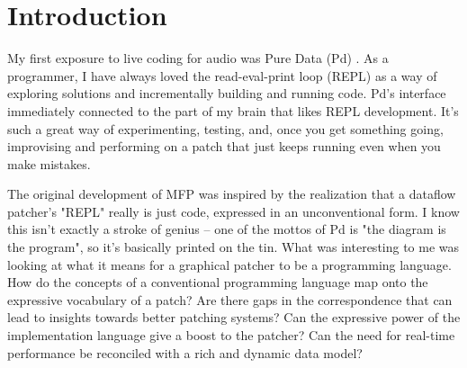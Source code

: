\documentclass[a4paper]{article}
\title{\papertitle}
\affiliation{ \paperauthorA}
{{\tt \href{mailto:grib@billgribble.com}{grib@billgribble.com}}}
\def\:{\hskip0pt}
\newif\ifpdf
\begin{document}
\ifpdf %
  \DeclareGraphicsExtensions{.png,.jpg,.pdf}
\else  %
\fi

\maketitle

\begin{abstract}
MFP is a graphical patching system distinguished by the ready
availability of Python data types and operations in patches.
Recent work has added support for live coding of
message\:-\:processing patch elements in Python, and of
signal\:-\:processing patch elements in Faust.  Its extensibility
and rich set of message data types give MFP some nice
capabilities for interactive patching.
\end{abstract}

\section{Introduction}
\label{sec:intro}

My first exposure to live coding for audio was Pure Data (Pd)
\cite{Puck:PureData}. As a programmer, I have always loved the
read-eval-print loop (REPL) as a way of exploring solutions and
incrementally building and running code. Pd's interface
immediately connected to the part of my brain that likes REPL
development. It's such a great way of experimenting, testing,
and, once you get something going, improvising and performing on
a patch that just keeps running even when you make mistakes.

The original development of MFP was inspired by the realization
that a dataflow patcher's "REPL" really is just code, expressed
in an unconventional form. I know this isn't exactly a stroke of
genius -- one of the mottos of Pd is "the diagram is the
program", so it's basically printed on the tin. What was
interesting to me was looking at what it means for a graphical
patcher to be a programming language. How do the concepts of a
conventional programming language map onto the expressive
vocabulary of a patch? Are there gaps in the correspondence that
can lead to insights towards better patching systems? Can the
expressive power of the implementation language give a boost to
the patcher? Can the need for real-time performance be reconciled
with a rich and dynamic data model?
\end{document}
